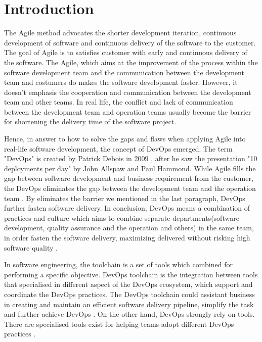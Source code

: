 \chapter{Introduction}
\label{chp:introduction}
The Agile method advocates the shorter development iteration, continuous development of software and continuous delivery of the software to the customer. The goal \cite{beck2001manifesto} of Agile is to satisfies customer with early and continuous delivery of the software.
The Agile, which aims at the improvement of the process within the software development team and the communication between the development team and costumers \cite{miglierina2014application} do makes the software development faster. However, it doesn't emphasis the cooperation and communication between the development team and other teams. In real life, the conflict and lack of communication between the development team and operation teams usually become the barrier for shortening the delivery time of the software project.
\par
Hence, in answer to how to solve the gaps and flaws when applying Agile into real-life software development, the concept of DevOps emerged. The term "DevOps" is created by Patrick Debois in 2009 \cite{kim2016devops}, after he saw the presentation "10 deployments per day" by John Allspaw and Paul Hammond. While Agile fills the gap between software development and business requirement from the customer, the DevOps eliminates the gap between the development team and the operation team \cite{WhatisaD20:online}. By eliminates the barrier we mentioned in the last paragraph, DevOps further fasten software delivery. In conclusion, DevOps means a combination of practices and culture which aims to combine separate departments(software development, quality assurance and the operation and others) in the same team, in order fasten the software delivery, maximizing delivered without risking high software quality \cite{DevOpsWi87:online}\cite{ebert2016devops}.
\par
In software engineering, the toolchain is a set of tools which combined for performing a specific objective. DevOps toolchain is the integration between tools that specialised in different aspect of the DevOps ecosystem, which support and coordinate the DevOps practices. The DevOps toolchain could assistant business in creating and maintain an efficient software delivery pipeline, simplify the task and further achieve DevOps \cite{DevOpsto7:online}. On the other hand, DevOps strongly rely on tools. There are specialised tools exist for helping teams adopt different DevOps practices \cite{zhu2016devops}. 
